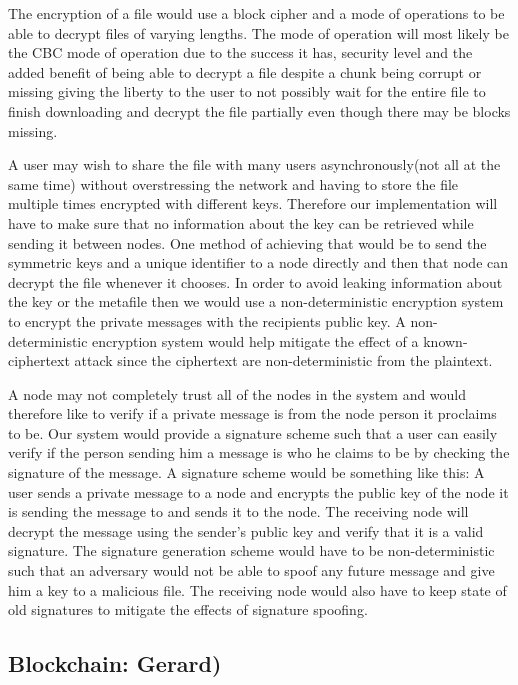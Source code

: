 \documentclass[12pt,a4paper,draft]{article}
\begin{document}
The encryption of a file would use a block cipher and a mode of operations to be able to decrypt files of varying lengths. The mode of operation will most likely be the CBC mode of operation due to the success it has, security level and the added benefit of being able to decrypt a file despite a chunk being corrupt or missing giving the liberty to the user to not possibly wait for the entire file to finish downloading and decrypt the file partially even though there may be blocks missing.

A user may wish to share the file with many users asynchronously(not all at the same time) without overstressing the network and having to store the file multiple times encrypted with different keys. Therefore our implementation will have to make sure that no information about the key can be retrieved while sending it between nodes. One method of achieving that would be to send the symmetric keys and a unique identifier to a node directly and then that node can decrypt the file whenever it chooses. In order to avoid leaking information about the key or the metafile then we would use a non-deterministic encryption system to encrypt the private messages with the recipients public key. A non-deterministic encryption system would help mitigate the effect of a known-ciphertext attack since the ciphertext are non-deterministic from the plaintext.

A node may not completely trust all of the nodes in the system and would therefore like to verify if a private message is from the node person it proclaims to be. Our system would provide a signature scheme such that a user can easily verify if the person sending him a message is who he claims to be by checking the signature of the message. A signature scheme would be something like this: A user sends a private message to a node and encrypts the public key of the node it is sending the message to and sends it to the node. The receiving node will decrypt the message using the sender's public key and verify that it is a valid signature. The signature generation scheme would have to be non-deterministic such that an adversary would not be able to spoof any future message and give him a key to a malicious file. The receiving node would also have to keep state of old signatures to mitigate the effects of signature spoofing.


\subsection{Blockchain: Gerard)}
\end{document}
